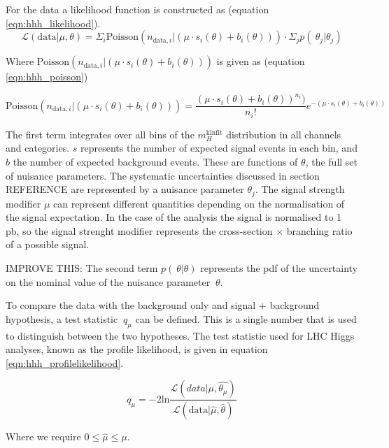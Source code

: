 For the data a likelihood function is constructed as (equation \ref{eqn:hhh_likelihood}).
\begin{equation} \label{eqn:hhh_likelihood}
\mathcal{L}(\text{data}|\mu, \theta) = \Sigma_i\text{Poisson}(n_{\text{data},i}|(\mu\cdot s_i(\theta) + b_i(\theta)) )\cdot \Sigma_j p(~\theta_j|\theta_j)
\end{equation}

Where $\text{Poisson}(n_{\text{data},i}|(\mu\cdot s_i(\theta)+b_i(\theta)))$ is given as (equation \ref{eqn:hhh_poisson})

\begin{equation}\label{eqn:hhh_poisson}
\text{Poisson}(n_{\text{data},i}|(\mu\cdot s_i(\theta)+b_i(\theta))) = \frac{(\mu\cdot s_i(\theta) + b_i(\theta))^{n_i})}{n_i!}e^{-(\mu\cdot s_i(\theta)+b_i(\theta))}
\end{equation}

The first term integrates over all bins of the $m_{H}^{\text{kinfit}}$ distribution 
in all channels and categories. $s$ represents the number of expected signal events
in each bin, and $b$ the number of expected background events. These are functions of 
$\theta$, the full set of nuisance parameters. The systematic uncertainties discussed in section 
REFERENCE are represented by a nuisance parameter $\theta_j$. The signal strength
modifier $\mu$ can represent different quantities depending on the normalisation of the 
signal expectation. In the case of the \Htohhtobbtautau analysis the signal is normalised
to 1 pb, so the signal strenght modifier represents
the cross-section $\times$ branching ratio of a possible signal.

IMPROVE THIS:
The second term $p(~\theta|\theta)$ represents the pdf of the uncertainty on the nominal
value of the nuisance parameter $~\theta$. 

To compare the data with the background only and signal + background hypothesis, a test
statistic $~q_{\mu}$ can be defined. This is a single 
number that is used to distinguish between the two hypotheses. The test
statistic used for LHC Higgs analyses, known as the profile likelihood, is given 
in equation \ref{eqn:hhh_profilelikelihood}.

\begin{equation}\label{eqn:hhh_profilelikelihood}
q_{\mu} = -2\text{ln}\frac{\mathcal{L}(data|\mu,\hat{\theta_{\mu}})}{\mathcal{L}(\text{data}|\hat{\mu},\hat{\theta})}
\end{equation}

Where we require $0 \leq \hat{\mu} \leq \mu$.

